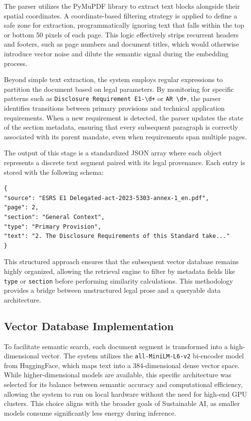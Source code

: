\documentclass[12pt]{article}
\begin{document}
The parser utilizes the PyMuPDF library to extract text blocks alongside their spatial coordinates. A coordinate-based filtering strategy is applied to define a safe zone for extraction, programmatically ignoring text that falls within the top or bottom 50 pixels of each page. This logic effectively strips recurrent headers and footers, such as page numbers and document titles, which would otherwise introduce vector noise and dilute the semantic signal during the embedding process.

Beyond simple text extraction, the system employs regular expressions to partition the document based on legal parameters. By monitoring for specific patterns such as \texttt{Disclosure Requirement E1-\textbackslash d+} or \texttt{AR \textbackslash d+}, the parser identifies transitions between primary provisions and technical application requirements. When a new requirement is detected, the parser updates the state of the section metadata, ensuring that every subsequent paragraph is correctly associated with its parent mandate, even when requirements span multiple pages.

The output of this stage is a standardized JSON array where each object represents a discrete text segment paired with its legal provenance. Each entry is stored with the following schema:
\begin{verbatim}
{
"source": "ESRS E1 Delegated-act-2023-5303-annex-1_en.pdf",
"page": 2,
"section": "General Context",
"type": "Primary Provision",
"text": "2. The Disclosure Requirements of this Standard take..."
}
\end{verbatim}

This structured approach ensures that the subsequent vector database remains highly organized, allowing the retrieval engine to filter by metadata fields like \texttt{type} or \texttt{section} before performing similarity calculations. This methodology provides a bridge between unstructured legal prose and a queryable data architecture.

\subsection{Vector Database Implementation}
To facilitate semantic search, each document segment is transformed into a high-dimensional vector. The system utilizes the \texttt{all-MiniLM-L6-v2} bi-encoder model from HuggingFace, which maps text into a 384-dimensional dense vector space. While higher-dimensional models are available, this specific architecture was selected for its balance between semantic accuracy and computational efficiency, allowing the system to run on local hardware without the need for high-end GPU clusters. This choice aligns with the broader goals of Sustainable AI, as smaller models consume significantly less energy during inference.
\end{document}
